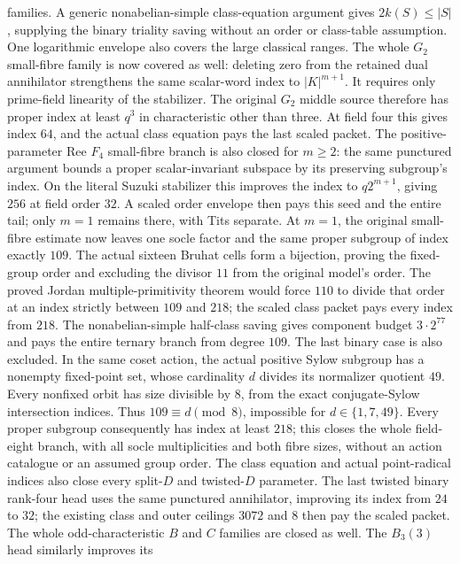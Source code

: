 families. A generic nonabelian-simple class-equation argument gives
$2k(S)\leq|S|$, supplying the binary triality saving without an order
or class-table assumption. One logarithmic envelope also covers the
large classical ranges. The whole $G_2$ small-fibre family is now covered
as well: deleting zero from the retained dual annihilator strengthens
the same scalar-word index to $|K|^{m+1}$. It requires only prime-field
linearity of the stabilizer. The original $G_2$ middle source therefore
has proper index at least $q^3$ in characteristic other than three.
At field four this gives index $64$, and the actual class equation pays
the last scaled packet. The positive-parameter Ree $F_4$ small-fibre
branch is also closed for $m\geq2$: the same punctured argument bounds
a proper scalar-invariant subspace by its preserving subgroup's index.
On the literal Suzuki stabilizer this improves the index to
$q2^{m+1}$, giving $256$ at field order $32$. A scaled order envelope
then pays this seed and the entire tail; only $m=1$ remains there,
with Tits separate. At $m=1$, the original small-fibre estimate now
leaves one socle factor and the same proper subgroup of index exactly
$109$. The actual sixteen Bruhat cells form a bijection, proving the
fixed-group order and excluding the divisor $11$ from the original
model's order. The proved Jordan multiple-primitivity theorem would
force $110$ to divide that order at an index strictly between $109$ and
$218$; the scaled class packet pays every index from $218$. The
nonabelian-simple half-class saving gives component budget $3\cdot2^{77}$
and pays the entire ternary branch from degree $109$. The last binary
case is also excluded. In the same coset action, the actual positive
Sylow subgroup has a nonempty fixed-point set, whose cardinality $d$
divides its normalizer quotient $49$. Every nonfixed orbit has size
divisible by $8$, from the exact conjugate-Sylow intersection indices.
Thus $109\equiv d\pmod8$, impossible for $d\in\{1,7,49\}$.
Every proper subgroup consequently has index at least $218$; this
closes the whole field-eight branch, with all socle multiplicities and
both fibre sizes, without an action catalogue or an assumed group order.
The class equation and actual point-radical indices also close every
split-$D$ and twisted-$D$ parameter. The last twisted binary rank-four
head uses the same punctured annihilator, improving its index from
$24$ to $32$; the existing class and outer ceilings $3072$ and $8$
then pay the scaled packet. The whole odd-characteristic $B$ and $C$
families are closed as well. The $B_3(3)$ head similarly improves its
